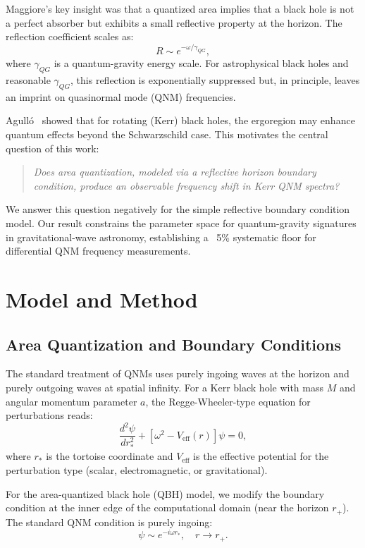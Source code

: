 \documentclass[10pt,amsmath,amssymb,amsfonts]{article}
\begin{document}
Maggiore's key insight was that a quantized area implies that a black hole is not a perfect absorber but exhibits a small reflective property at the horizon. The reflection coefficient scales as:
\begin{equation}
R \sim e^{-\omega/\gamma_{QG}},
\end{equation}
where $\gamma_{QG}$ is a quantum-gravity energy scale. For astrophysical black holes and reasonable $\gamma_{QG}$, this reflection is exponentially suppressed but, in principle, leaves an imprint on quasinormal mode (QNM) frequencies.

Agull\'o~\cite{agullo2020} showed that for rotating (Kerr) black holes, the ergoregion may enhance quantum effects beyond the Schwarzschild case. This motivates the central question of this work:

\begin{quote}
\textit{Does area quantization, modeled via a reflective horizon boundary condition, produce an observable frequency shift in Kerr QNM spectra?}
\end{quote}

We answer this question negatively for the simple reflective boundary condition model. Our result constrains the parameter space for quantum-gravity signatures in gravitational-wave astronomy, establishing a ~5\% systematic floor for differential QNM frequency measurements.

\section{Model and Method}

\subsection{Area Quantization and Boundary Conditions}

The standard treatment of QNMs uses purely ingoing waves at the horizon and purely outgoing waves at spatial infinity. For a Kerr black hole with mass $M$ and angular momentum parameter $a$, the Regge-Wheeler-type equation for perturbations reads:
\begin{equation}
\frac{d^2\psi}{dr_*^2} + \left[\omega^2 - V_{\text{eff}}(r)\right]\psi = 0,
\end{equation}
where $r_*$ is the tortoise coordinate and $V_{\text{eff}}$ is the effective potential for the perturbation type (scalar, electromagnetic, or gravitational).

For the area-quantized black hole (QBH) model, we modify the boundary condition at the inner edge of the computational domain (near the horizon $r_+$). The standard QNM condition is purely ingoing:
\begin{equation}
\psi \sim e^{-i\omega r_*}, \quad r \to r_+.
\end{equation}
\end{document}
